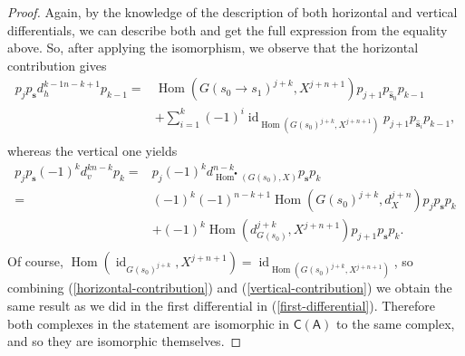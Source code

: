 \documentclass[reqno,11pt]{amsart}
\theoremstyle{plain}
\theoremstyle{remark}
\theoremstyle{definition}
\numberwithin{equation}{thm}
\newcommand{\SA}{\mathsf{A}}
\newcommand{\CCC}{\boldsymbol{\mathsf{C}}}
\DeclareMathOperator{\Hom}{Hom}
\DeclareMathOperator{\id}{id}
\begin{document}
\begin{proof}
		Again, by the knowledge of the description of both horizontal and vertical differentials, we can describe both and get the full expression from the equality above. So, after applying the isomorphism, we observe that the horizontal contribution gives
		\begin{equation}\label{horizontal-contribution}
			\begin{aligned}
				p_j  p_{\textbf{s}} d_h^{k-1 n-k+1} p_{k-1} =& \Hom\left(G(s_0 \to s_1)^{j+k}, X^{j+n+1}\right) p_{j+1} p_{\widehat{\textbf{s}}_0} p_{k-1} \\
				&+ \sum_{i=1}^{k} (-1)^i \id_{\Hom(G(s_0)^{j+k}, X^{j+n+1})} p_{j+1} p_{\widehat{\textbf{s}}_i} p_{k-1}, \\
			\end{aligned}
		\end{equation}
		whereas the vertical one yields 
		\begin{equation}\label{vertical-contribution}
			\begin{aligned}
				p_j  p_{\textbf{s}} (-1)^k d_v^{k n-k} p_{k} =& p_j (-1)^k d_{\Hom^\bullet(G(s_0),X)}^{n-k} p_{\textbf{s}} p_{k} \\
				=& (-1)^k (-1)^{n-k+1} \Hom\left(G(s_0)^{j+k},d_X^{j+n}\right) p_j p_{\textbf{s}} p_{k} \\
				&+ (-1)^k  \Hom\left(d_{G(s_0)}^{j+k}, X^{j+n+1}\right) p_{j+1} p_{\textbf{s}} p_{k}. \\
			\end{aligned}
		\end{equation}
		Of course, $\Hom\left(\id_{G(s_0)^{j+k}}, X^{j+n+1}\right) = \id_{\Hom(G(s_0)^{j+k}, X^{j+n+1})}$, so combining (\ref{horizontal-contribution}) and (\ref{vertical-contribution}) we obtain the same result as we did in the first differential in (\ref{first-differential}). Therefore both complexes in the statement are isomorphic in $\CCC(\SA)$ to the same complex, and so they are isomorphic themselves.
	\end{proof}
	
\end{document}
